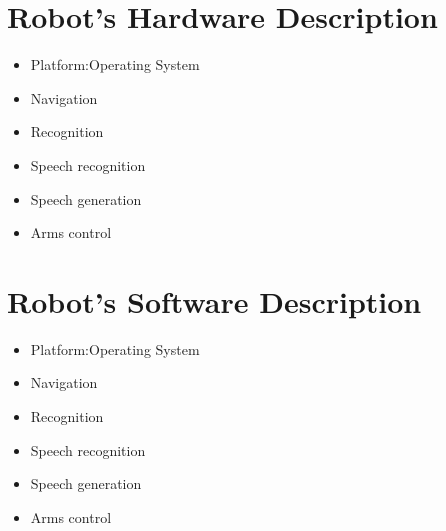 
%
%

\section*{Robot's Hardware Description}
\label{sec:annex-OPL}

\begin{itemize}[nosep]
	\item Platform:Operating System
  \item Navigation
  \item Recognition
  \item Speech recognition
  \item Speech generation
  \item Arms control
\end{itemize}

\section*{Robot's Software Description}

\begin{itemize}[nosep]
	\item Platform:Operating System
  \item Navigation
  \item Recognition
  \item Speech recognition
  \item Speech generation
  \item Arms control
\end{itemize}


